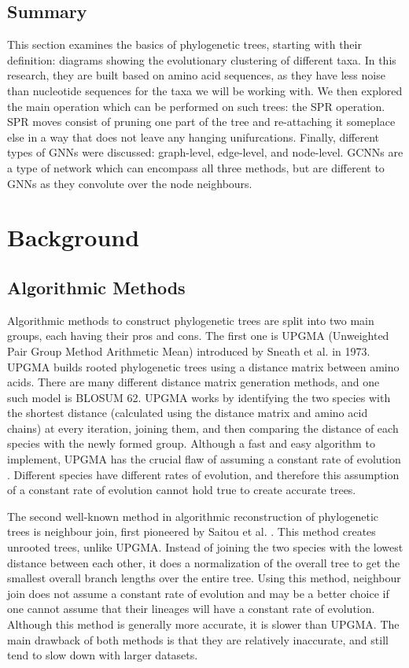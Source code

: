 \documentclass{mpaper}
\begin{document}
\subsection{Summary}

This section examines the basics of phylogenetic trees, starting with their definition: diagrams showing the evolutionary clustering of different taxa. In this research, they are built based on amino acid sequences, as they have less noise than nucleotide sequences for the taxa we will be working with. We then explored the main operation which can be performed on such trees: the SPR operation. SPR moves consist of pruning one part of the tree and re-attaching it someplace else in a way that does not leave any hanging unifurcations. Finally, different types of GNNs were discussed: graph-level, edge-level, and node-level. GCNNs are a type of network which can encompass all three methods, but are different to GNNs as they convolute over the node neighbours.

\section{Background}

\subsection{Algorithmic Methods}

Algorithmic methods to construct phylogenetic trees are split into two main groups, each having their pros and cons. The first one is UPGMA (Unweighted Pair Group Method Arithmetic Mean) introduced by Sneath et al. \cite{sneath1973numerical} in 1973. UPGMA builds rooted phylogenetic trees using a distance matrix between amino acids. There are many different distance matrix generation methods, and one such model is BLOSUM 62. UPGMA works by identifying the two species with the shortest distance (calculated using the distance matrix and amino acid chains) at every iteration, joining them, and then comparing the distance of each species with the newly formed group. Although a fast and easy algorithm to implement, UPGMA  has the crucial flaw of assuming a constant rate of evolution \cite{melnick11985genetic}. Different species have different rates of evolution, and therefore this assumption of a constant rate of evolution cannot hold true to create accurate trees. 

The second well-known method in algorithmic reconstruction of phylogenetic trees is neighbour join, first pioneered by Saitou et al. \cite{njpaper}. This method creates unrooted trees, unlike UPGMA. Instead of joining the two species with the lowest distance between each other, it does a normalization of the overall tree to get the smallest overall branch lengths over the entire tree. Using this method, neighbour join does not assume a constant rate of evolution and may be a better choice if one cannot assume that their lineages will have a constant rate of evolution. Although this method is generally more accurate, it is slower than UPGMA. The main drawback of both methods is that they are relatively inaccurate, and still tend to slow down with larger datasets.
\end{document}
